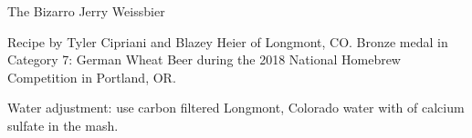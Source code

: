\begin{recipe}{The Bizarro Jerry Weissbier}

\begin{aboutblock}
Recipe by Tyler Cipriani and Blazey Heier of Longmont, CO. Bronze medal in 
Category 7: German Wheat Beer during the 2018 National Homebrew Competition
in Portland, OR. \sourceaha
\end{aboutblock}


\begin{methodandtiming}
 
\begin{mashsteps}
\end{mashsteps}

\begin{fermentationsteps}
\end{fermentationsteps}

\begin{directions}
Water adjustment: use carbon filtered Longmont, Colorado water with  of
calcium sulfate in the mash.
\end{directions}

\end{methodandtiming}

\recipebreak

\begin{ingredientsblock}

\begin{malts}
\end{malts}

\begin{hops}
\end{hops}


\end{ingredientsblock}

\end{recipe}

